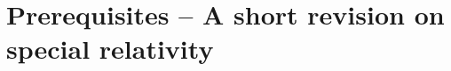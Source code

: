 \documentclass[../classnotes.tex]{subfiles}
\begin{document}
\chapter{Prerequisites -- A short revision on special relativity}
\end{document}

